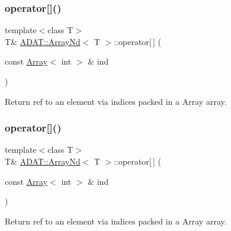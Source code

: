 \subsubsection{\texorpdfstring{operator[]()}{operator[]()}\hspace{0.1cm}{\footnotesize\ttfamily [2/6]}}
{\footnotesize\ttfamily template$<$class T$>$ \\
T\& \mbox{\hyperlink{classADAT_1_1ArrayNd}{A\+D\+A\+T\+::\+Array\+Nd}}$<$ T $>$\+::operator\mbox{[}$\,$\mbox{]} (\begin{DoxyParamCaption}\item[{const \mbox{\hyperlink{classXMLArray_1_1Array}{Array}}$<$ int $>$ \&}]{ind }\end{DoxyParamCaption})\hspace{0.3cm}{\ttfamily [inline]}}



Return ref to an element via indices packed in a Array array. 

\mbox{\label{classADAT_1_1ArrayNd_a5689e9a64be5914877dc3882cc68a283}} 
\subsubsection{\texorpdfstring{operator[]()}{operator[]()}\hspace{0.1cm}{\footnotesize\ttfamily [3/6]}}
{\footnotesize\ttfamily template$<$class T$>$ \\
T\& \mbox{\hyperlink{classADAT_1_1ArrayNd}{A\+D\+A\+T\+::\+Array\+Nd}}$<$ T $>$\+::operator\mbox{[}$\,$\mbox{]} (\begin{DoxyParamCaption}\item[{const \mbox{\hyperlink{classXMLArray_1_1Array}{Array}}$<$ int $>$ \&}]{ind }\end{DoxyParamCaption})\hspace{0.3cm}{\ttfamily [inline]}}



Return ref to an element via indices packed in a Array array. 

\mbox{\label{classADAT_1_1ArrayNd_a3b7160cbd3939f68f4a23df8cc56d2df}} 
